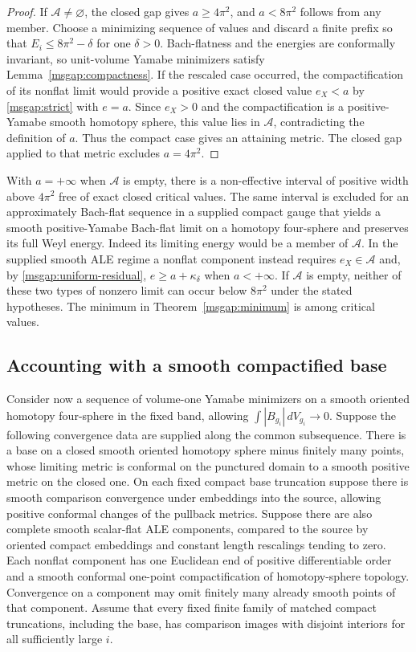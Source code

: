 \documentclass[11pt]{article}
\numberwithin{equation}{section}
\theoremstyle{definition}
\theoremstyle{remark}
\begin{document}
\begin{proof}
If \(\mathcal A\ne\varnothing\), the closed gap gives
\(a\ge4\pi^2\), and \(a<8\pi^2\) follows from any member.
Choose a minimizing sequence of values and discard a finite
prefix so that \(E_i\le8\pi^2-\delta\) for one \(\delta>0\).
Bach-flatness and the energies are conformally invariant,
so unit-volume Yamabe minimizers satisfy
Lemma~\ref{msgap:compactness}. If the rescaled case occurred,
the compactification of its nonflat limit would provide a
positive exact closed value \(e_X< a\) by \eqref{msgap:strict}
with \(e=a\). Since \(e_X>0\) and the compactification is a
positive-Yamabe smooth homotopy sphere, this value lies in
\(\mathcal A\), contradicting the definition of \(a\).
Thus the compact case gives an attaining metric. The closed
gap applied to that metric excludes \(a=4\pi^2\).
\end{proof}

With \(a=+\infty\) when \(\mathcal A\) is empty, there is a
non-effective interval of positive width above \(4\pi^2\)
free of exact closed critical values. The same interval is
excluded for an approximately Bach-flat sequence in a supplied
compact gauge that yields a smooth positive-Yamabe Bach-flat
limit on a homotopy four-sphere and preserves its full Weyl
energy. Indeed its limiting energy would be a member of
\(\mathcal A\). In the supplied smooth ALE regime a nonflat
component instead requires \(e_X\in\mathcal A\) and, by
\eqref{msgap:uniform-residual}, \(e\ge a+\kappa_\delta\) when
\(a<+\infty\). If \(\mathcal A\) is empty, neither of these two
types of nonzero limit can occur below \(8\pi^2\) under the
stated hypotheses. The minimum in Theorem~\ref{msgap:minimum}
is among critical values.

\subsection{Accounting with a smooth compactified base}

Consider now a sequence of volume-one Yamabe minimizers on a
smooth oriented homotopy four-sphere in the fixed band, allowing
\(\int |B_{g_i}|\,dV_{g_i}\to0\). Suppose the following
convergence data are supplied along the common subsequence.
There is a base on a closed smooth oriented homotopy sphere
minus finitely many points, whose limiting metric is conformal on
the punctured domain to a smooth positive metric on the closed
one. On each fixed compact base truncation suppose there is
smooth comparison convergence under embeddings into the source,
allowing positive conformal changes of the pullback metrics.
Suppose there are also complete smooth scalar-flat ALE components,
compared to the source by oriented compact embeddings and constant
length rescalings tending to zero. Each nonflat component has one
Euclidean end of positive differentiable order and a smooth
conformal one-point compactification of homotopy-sphere topology.
Convergence on a component may omit finitely many already smooth
points of that component. Assume that every fixed finite family of
matched compact truncations, including the base, has comparison
images with disjoint interiors for all sufficiently large \(i\).
\end{document}
